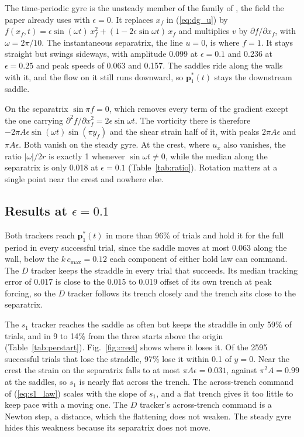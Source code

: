 \documentclass[11pt]{article}
\newcommand{\Dtr}{$D$ tracker}
\newcommand{\Str}{$s_1$ tracker}
\begin{document}
The time-periodic gyre is the unsteady member of the family of \cite{17},
the field the paper already uses with $\epsilon = 0$. It replaces $x_f$ in
(\ref{eq:dg_u}) by
$f(x_f, t) = \epsilon\sin(\omega t)\,x_f^2 + (1 - 2\epsilon\sin\omega t)\,x_f$
and multiplies $v$ by $\partial f/\partial x_f$, with $\omega = 2\pi/10$.
The instantaneous separatrix, the line $u = 0$, is where $f = 1$. It
stays straight but swings sideways, with amplitude 0.099 at
$\epsilon = 0.1$ and 0.236 at $\epsilon = 0.25$ and peak speeds of 0.063
and 0.157. The saddles ride along the walls with it, and the flow on it
still runs downward, so $\mathbf{p}^*_1(t)$ stays the downstream saddle.

On the separatrix $\sin\pi f = 0$, which removes every term of the
gradient except the one carrying $\partial^2 f/\partial x_f^2 =
2\epsilon\sin\omega t$. The vorticity there is therefore
$-2\pi A\epsilon\sin(\omega t)\sin(\pi y_f)$ and the shear strain half of
it, with peaks $2\pi A\epsilon$ and $\pi A\epsilon$. Both vanish on the
steady gyre. At the crest, where $u_x$ also vanishes, the ratio
$|\omega|/2r$ is exactly 1 whenever $\sin\omega t \neq 0$, while the
median along the separatrix is only 0.018 at $\epsilon = 0.1$
(Table~\ref{tab:ratio}). Rotation matters at a single point near the
crest and nowhere else.

\subsection{Results at $\epsilon = 0.1$}

Both trackers reach $\mathbf{p}^*_1(t)$ in more than 96\% of trials and
hold it for the full period in every successful trial, since the saddle
moves at most 0.063 along the wall, below the $k\,c_{\max} = 0.12$ each
component of either hold law can command. The \Dtr{} keeps the straddle
in every trial that succeeds. Its median tracking error of 0.017 is close
to the 0.015 to 0.019 offset of its own trench at peak forcing, so the
\Dtr{} follows its trench closely and the trench sits close to the
separatrix.

The \Str{} reaches the saddle as often but keeps the straddle in only
59\% of trials, and in 9 to 14\% from the three starts above the origin
(Table~\ref{tab:perstart}). Fig.~\ref{fig:crest} shows where it loses it.
Of the 2595 successful trials that lose the straddle, 97\% lose it within
0.1 of $y = 0$. Near the crest the strain on the separatrix falls to at
most $\pi A\epsilon = 0.031$, against $\pi^2 A = 0.99$ at the saddles, so
$s_1$ is nearly flat across the trench. The across-trench command of
(\ref{eq:s1_law}) scales with the slope of $s_1$, and a flat trench gives
it too little to keep pace with a moving one. The \Dtr{}'s across-trench
command is a Newton step, a distance, which the flattening does not
weaken. The steady gyre hides this weakness because its separatrix does
not move.
\end{document}

